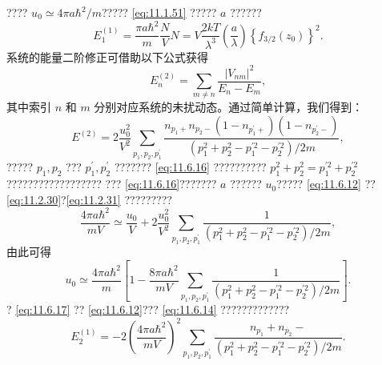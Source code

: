 ???? \(u_{0} \simeq 4\pi a\hbar^{2}/m\)????? \autoref{eq:11.1.51} ????? \(a\) ??????
\begin{equation}\tag{11.6.22}\label{eq:11.6.22}
E _ { 1 } ^{( 1 )} = \frac { \pi a \hbar ^{2} } { m } \frac { N } { V } N = V \frac { 2 k T } { \lambda ^{3} } \left( \frac { a } { \lambda } \right) \left\{ f _ { 3 / 2 } ( z _ { 0 } ) \right\} ^{2} .
\end{equation}
系统的能量二阶修正可借助以下公式获得
\begin{equation}\tag{11.6.23}\label{eq:11.6.23}
E _ { n } ^{( 2 )} = \sum _ { m \neq n } \frac { | V _ { n m } | ^{2} } { E _ { n } - E _ { m } } ,
\end{equation}
其中索引 \(n\) 和 \(m\) 分别对应系统的未扰动态。通过简单计算，我们得到：
\begin{equation}\tag{11.6.24}\label{eq:11.6.24}
E ^{( 2 )} = 2 \frac { u _ { 0 } ^{2} } { V ^{2} } \sum _ { p _ { 1 } , p _ { 2 } , p _ { 1 } ^{\prime} } \frac { n _ { p _ { 1 } + } n _ { p _ { 2 } - } \left( 1 - n _ { p _ { 1 } ^{\prime} + } \right) \left( 1 - n _ { p _ { 2 } ^{\prime} - } \right) } { \left( p _ { 1 } ^{2} + p _ { 2 } ^{2} - p _ { 1 } ^{\prime 2} - p _ { 2 } ^{\prime 2} \right) / 2 m } ,
\end{equation}
????? \(p_{1},p_{2}\) ??? \(p_{1}^{\prime},p_{2}^{\prime}\) ??????? \autoref{eq:11.6.16} ?????????? \(p_{1}^{2}+p_{2}^{2}=p_{1}^{\prime 2}+p_{2}^{\prime 2}\)??????????????????
??? \autoref{eq:11.6.16}??????? \(a\) ?????? \(u_0\)????? \autoref{eq:11.6.12} ?? \autoref{eq:11.2.30}?\autoref{eq:11.2.31} ?????????
\begin{equation}\tag{11.6.25}\label{eq:11.6.25}
\frac { 4 \pi a \hbar ^{2} } { m V } \simeq \frac { u _ { 0 } } { V } + 2 \frac { u _ { 0 } ^{2} } { V ^{2} } \sum _ { p _ { 1 } , p _ { 2 } , p _ { 1 } ^{\prime} } \frac { 1 } { \left( p _ { 1 } ^{2} + p _ { 2 } ^{2} - p _ { 1 } ^{\prime 2} - p _ { 2 } ^{\prime 2} \right) / 2 m } ,
\end{equation}
由此可得
\begin{equation}\tag{11.6.26}\label{eq:11.6.26}
u _ { 0 } \simeq \frac { 4 \pi a \hbar ^{2} } { m } \left[ 1 - \frac { 8 \pi a \hbar ^{2} } { m V } \sum _ { p _ { 1 } , p _ { 2 } , p _ { 1 } ^{\prime} } \frac { 1 } { \left( p _ { 1 } ^{2} + p _ { 2 } ^{2} - p _ { 1 } ^{\prime 2} - p _ { 2 } ^{\prime 2} \right) / 2 m } \right] .
\end{equation}
? \autoref{eq:11.6.17} ?? \autoref{eq:11.6.12}??? \autoref{eq:11.6.14} ?????????????
\begin{equation}\tag{11.6.27}\label{eq:11.6.27}
E _ { 2 } ^{( 1 )} = - 2 \left( \frac { 4 \pi a \hbar ^{2} } { m V } \right) ^{2} \sum _ { p _ { 1 } , p _ { 2 } , p _ { 1 } ^{\prime} } \frac { n _ { p _ { 1 } } + n _ { p _ { 2 } } - } { \left( p _ { 1 } ^{2} + p _ { 2 } ^{2} - p _ { 1 } ^{\prime 2} - p _ { 2 } ^{\prime 2} \right) / 2 m } .
\end{equation}

